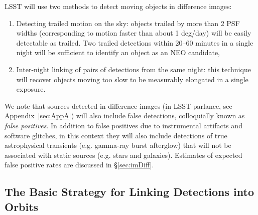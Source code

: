 LSST will use two methods to detect moving objects in difference images:
\begin{enumerate}
\item Detecting trailed motion on the sky: objects trailed by more
  than 2 PSF widths (corresponding to motion faster than about 1
  deg/day) will be easily detectable as trailed.  Two trailed
  detections within 20--60 minutes in a single night will be
  sufficient to identify an object as an NEO candidate,
\item Inter-night linking of pairs of detections from the same night: this technique will
  recover objects moving too slow to be measurably elongated in a single exposure.
\end{enumerate}

We note that sources detected in difference images (\DIASources in LSST parlance, see Appendix~\ref{sec:AppA})
will also include false detections, colloquially known as {\it false positives}.
In addition to false positives due to instrumental artifacts and software glitches,
in this context they will also include detections of true astrophysical transients
(e.g. gamma-ray burst afterglow) that will not be associated with static sources
(e.g. stars and galaxies). Estimates of expected false positive rates are discussed
in \S\ref{sec:imDiff}.



\subsection{The Basic Strategy for Linking Detections into Orbits}

